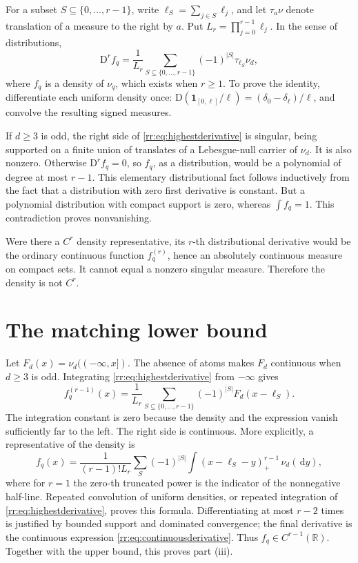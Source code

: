 \documentclass[11pt,a4paper,oneside,openany]{book}
\numberwithin{equation}{chapter}
\theoremstyle{definition}
\theoremstyle{remark}
\newcommand{\R}{\mathbb R}
\newcommand{\dd}{\,\mathrm d}
\newcommand{\D}{\mathrm D}
\begin{document}
For a subset \(S\subseteq\{0,\ldots,r-1\}\), write
\(\ell_S=\sum_{j\in S}\ell_j\), and let \(\tau_a\nu\) denote translation of a measure to the right by \(a\). Put \(L_r=\prod_{j=0}^{r-1}\ell_j\). In the sense of distributions,
\begin{equation}
 \D^r f_q=
 \frac1{L_r}\sum_{S\subseteq\{0,\ldots,r-1\}}(-1)^{|S|}\tau_{\ell_S}\nu_d,
 \label{rr:eq:highestderivative}
\end{equation}
where \(f_q\) is a density of \(\nu_q\), which exists when \(r\geq1\). To prove the identity, differentiate each uniform density once:
\(\D(\mathbf1_{[0,\ell]}/\ell)=(\delta_0-\delta_\ell)/\ell\), and convolve the resulting signed measures.

If \(d\geq3\) is odd, the right side of \eqref{rr:eq:highestderivative} is singular, being supported on a finite union of translates of a Lebesgue-null carrier of \(\nu_d\). It is also nonzero. Otherwise \(\D^rf_q=0\), so \(f_q\), as a distribution, would be a polynomial of degree at most \(r-1\). This elementary distributional fact follows inductively from the fact that a distribution with zero first derivative is constant. But a polynomial distribution with compact support is zero, whereas \(\int f_q=1\). This contradiction proves nonvanishing.

Were there a \(C^r\) density representative, its \(r\)-th distributional derivative would be the ordinary continuous function \(f_q^{(r)}\), hence an absolutely continuous measure on compact sets. It cannot equal a nonzero singular measure. Therefore the density is not \(C^r\).

\section{The matching lower bound}
Let \(F_d(x)=\nu_d(( -\infty,x])\). The absence of atoms makes \(F_d\) continuous when \(d\geq3\) is odd. Integrating \eqref{rr:eq:highestderivative} from \(-\infty\) gives
\begin{equation}
 f_q^{(r-1)}(x)=\frac1{L_r}
       \sum_{S\subseteq\{0,\ldots,r-1\}}(-1)^{|S|}F_d(x-\ell_S).
 \label{rr:eq:continuousderivative}
\end{equation}
The integration constant is zero because the density and the expression vanish sufficiently far to the left. The right side is continuous. More explicitly, a representative of the density is
\begin{equation}
 f_q(x)=\frac1{(r-1)!L_r}\sum_S(-1)^{|S|}
                 \int (x-\ell_S-y)_+^{r-1}\,\nu_d(\dd y),
 \label{rr:eq:truncatedpowers}
\end{equation}
where for \(r=1\) the zero-th truncated power is the indicator of the nonnegative half-line. Repeated convolution of uniform densities, or repeated integration of \eqref{rr:eq:highestderivative}, proves this formula. Differentiating at most \(r-2\) times is justified by bounded support and dominated convergence; the final derivative is the continuous expression \eqref{rr:eq:continuousderivative}. Thus \(f_q\in C^{r-1}(\R)\). Together with the upper bound, this proves part (iii).
\end{document}
